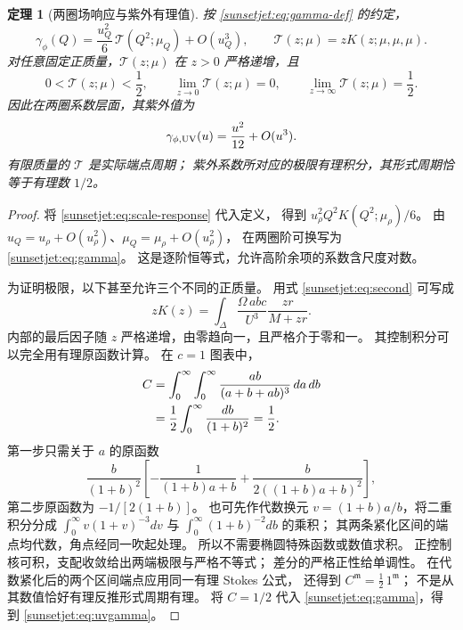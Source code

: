 \documentclass[11pt,a4paper,oneside]{ctexart}
\theoremstyle{cnplain}
\newtheorem{theorem}{定理}[section]
\theoremstyle{definition}
\theoremstyle{remark}
\numberwithin{equation}{section}
\begin{document}
\begin{theorem}[两圈场响应与紫外有理值]\label{sunsetjet:thm:gamma}
按 \eqref{sunsetjet:eq:gamma-def} 的约定，
\begin{equation}\label{sunsetjet:eq:gamma}
 \gamma_\phi(Q)=\frac{u_Q^2}{6}\,\mathcal T(Q^2;\mu_Q)+O(u_Q^3),
 \qquad
 \mathcal T(z;\mu)=zK(z;\mu,\mu,\mu).
\end{equation}
对任意固定正质量，$\mathcal T(z;\mu)$ 在 $z>0$ 严格递增，且
\begin{equation}\label{sunsetjet:eq:threshold}
 0<\mathcal T(z;\mu)<\frac12,\qquad
 \lim_{z\to0}\mathcal T(z;\mu)=0,\qquad
 \lim_{z\to\infty}\mathcal T(z;\mu)=\frac12.
\end{equation}
因此在两圈系数层面，其紫外值为
\begin{equation}\label{sunsetjet:eq:uvgamma}
 \gamma_{\phi,\rm UV}(u)=\frac{u^2}{12}+O(u^3).
\end{equation}
有限质量的 $\mathcal T$ 是实际端点周期；
紫外系数所对应的极限有理积分，其形式周期恰等于有理数 $1/2$。
\end{theorem}
\begin{proof}
将 \eqref{sunsetjet:eq:scale-response} 代入定义，
得到 $u_\rho^2Q^2K(Q^2;\mu_\rho)/6$。
由 $u_Q=u_\rho+O(u_\rho^2)$、$\mu_Q=\mu_\rho+O(u_\rho^2)$，
在两圈阶可换写为 \eqref{sunsetjet:eq:gamma}。
这是逐阶恒等式，允许高阶余项的系数含尺度对数。

为证明极限，以下甚至允许三个不同的正质量。
用式 \eqref{sunsetjet:eq:second} 可写成
\begin{equation}\label{sunsetjet:eq:monotone}
 zK(z)=\int_\Delta\frac{\Omega\,abc}{U^3}
                    \frac{zr}{M+zr}.
\end{equation}
内部的最后因子随 $z$ 严格递增，由零趋向一，且严格介于零和一。
其控制积分可以完全用有理原函数计算。
在 $c=1$ 图表中，
\begin{align}
 C&=\int_0^\infty\int_0^\infty
          \frac{ab}{(a+b+ab)^3}\,da\,db \notag\\
  &=\frac12\int_0^\infty\frac{db}{(1+b)^2}
   =\frac12. \label{sunsetjet:eq:C}
\end{align}
第一步只需关于 $a$ 的原函数
\[
 \frac{b}{(1+b)^2}
 \left[-\frac{1}{(1+b)a+b}
       +\frac{b}{2((1+b)a+b)^2}\right],
\]
第二步原函数为 $-1/[2(1+b)]$。
也可先作代数换元 $v=(1+b)a/b$，将二重积分分成
$\int_0^\infty v(1+v)^{-3}dv$ 与
$\int_0^\infty(1+b)^{-2}db$ 的乘积；
其两条紧化区间的端点均代数，角点经同一吹起处理。
所以不需要椭圆特殊函数或数值求积。
正控制核可积，支配收敛给出两端极限与严格不等式；
差分的严格正性给单调性。
在代数紧化后的两个区间端点应用同一有理 Stokes 公式，
还得到 $C^{\mathfrak m}=\tfrac12\,1^{\mathfrak m}$；
不是从其数值恰好有理反推形式周期有理。
将 $C=1/2$ 代入 \eqref{sunsetjet:eq:gamma}，得到 \eqref{sunsetjet:eq:uvgamma}。
\end{proof}
\end{document}
